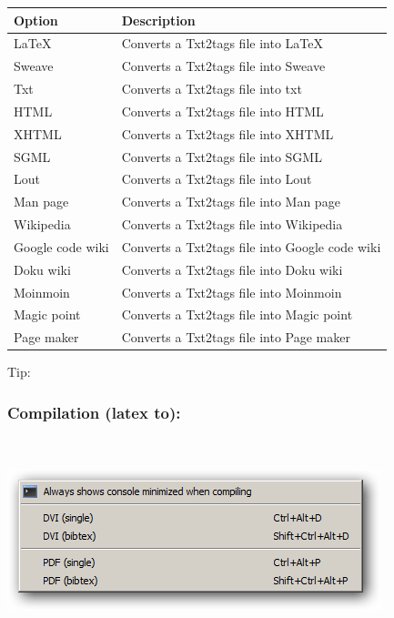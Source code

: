 \begin{scriptsize}\begin{tabularx}{\textwidth}{>{\hsize=0.3\hsize}X>{\hsize=0.7\hsize}X}\\
    \hline
    \textbf{Option} & \textbf{Description} \\
    \hline
    LaTeX & Converts a Txt2tags file into LaTeX \\
    Sweave & Converts a Txt2tags file into Sweave \\
    Txt & Converts a Txt2tags file into txt \\
    HTML & Converts a Txt2tags file into HTML \\
    XHTML & Converts a Txt2tags file into XHTML \\
    SGML & Converts a Txt2tags file into SGML \\
    Lout & Converts a Txt2tags file into Lout \\
    Man page & Converts a Txt2tags file into Man page \\
    Wikipedia & Converts a Txt2tags file into Wikipedia \\
    Google code wiki & Converts a Txt2tags file into Google code wiki \\
    Doku wiki & Converts a Txt2tags file into Doku wiki \\
    Moinmoin & Converts a Txt2tags file into Moinmoin \\
    Magic point & Converts a Txt2tags file into Magic point \\
    Page maker & Converts a Txt2tags file into Page maker \\
    \hline
  \end{tabularx}\end{scriptsize}

Tip: 


\hypertarget{menu_tools_processing_conversion_compilation}{}
\subsubsection{Compilation (latex to):}\\

\includegraphics[scale=0.50]{./res/menu_tools_processing_compilation.png}\\

